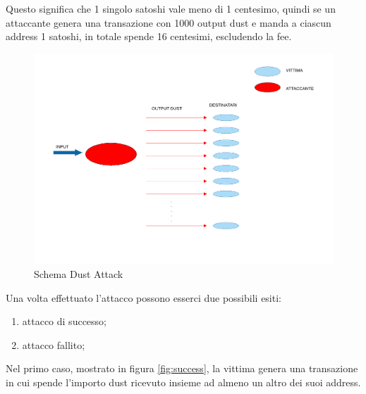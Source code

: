 Questo significa che 1 singolo satoshi vale meno di 1 centesimo, quindi se un attaccante genera una transazione con 1000 output dust e manda a ciascun address 1 satoshi, in totale spende 16 centesimi, escludendo la fee.   
\begin{figure}[h!]
    \centering
    \includegraphics[scale=0.4]{Images/dust_attack.pdf}
    \caption{Schema Dust Attack}
    \label{fig:Dust_attack}
\end{figure}
\FloatBarrier
Una volta effettuato l'attacco possono esserci due possibili esiti: 
    \begin{enumerate}
        \item attacco di successo;
        \item attacco fallito;
    \end{enumerate}
    
Nel primo caso, mostrato in figura \ref{fig:success}, la vittima genera una transazione in cui spende l'importo dust ricevuto insieme ad almeno un altro dei suoi address. 

